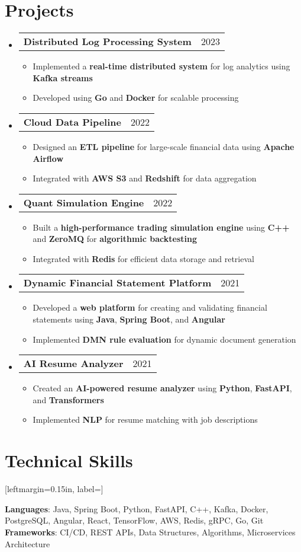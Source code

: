 \documentclass[letterpaper,11pt]{article}
\makeatletter
\newcommand{\resumeItem}[1]{
    \item\small{
            {#1 \vspace{-2pt}}
    }
}
\newcommand{\resumeProjectHeading}[2]{
    \item
    \begin{tabular*}{0.97\textwidth}{l@{\extracolsep{\fill}}r}
    \small#1 & #2 \\
    \end{tabular*}\vspace{-7pt}
}
\newcommand{\resumeSubHeadingListStart}{\begin{itemize}[leftmargin=0.15in, label={}]}
\newcommand{\resumeSubHeadingListEnd}{\end{itemize}}
\newcommand{\resumeItemListStart}{\begin{itemize}}
\newcommand{\resumeItemListEnd}{\end{itemize}\vspace{-5pt}}
\makeatother
\begin{document}
\section{Projects}
\resumeSubHeadingListStart
\resumeProjectHeading
{\textbf{Distributed Log Processing System}}{2023}
\resumeItemListStart
\resumeItem{Implemented a \textbf{real-time distributed system} for log analytics using \textbf{Kafka streams}}
\resumeItem{Developed using \textbf{Go} and \textbf{Docker} for scalable processing}
\resumeItemListEnd
\resumeProjectHeading
{\textbf{Cloud Data Pipeline}}{2022}
\resumeItemListStart
\resumeItem{Designed an \textbf{ETL pipeline} for large-scale financial data using \textbf{Apache Airflow}}
\resumeItem{Integrated with \textbf{AWS S3} and \textbf{Redshift} for data aggregation}
\resumeItemListEnd
\resumeProjectHeading
{\textbf{Quant Simulation Engine}}{2022}
\resumeItemListStart
\resumeItem{Built a \textbf{high-performance trading simulation engine} using \textbf{C++} and \textbf{ZeroMQ} for \textbf{algorithmic backtesting}}
\resumeItem{Integrated with \textbf{Redis} for efficient data storage and retrieval}
\resumeItemListEnd
\resumeProjectHeading
{\textbf{Dynamic Financial Statement Platform}}{2021}
\resumeItemListStart
\resumeItem{Developed a \textbf{web platform} for creating and validating financial statements using \textbf{Java}, \textbf{Spring Boot}, and \textbf{Angular}}
\resumeItem{Implemented \textbf{DMN rule evaluation} for dynamic document generation}
\resumeItemListEnd
\resumeProjectHeading
{\textbf{AI Resume Analyzer}}{2021}
\resumeItemListStart
\resumeItem{Created an \textbf{AI-powered resume analyzer} using \textbf{Python}, \textbf{FastAPI}, and \textbf{Transformers}}
\resumeItem{Implemented \textbf{NLP} for resume matching with job descriptions}
\resumeItemListEnd
\resumeSubHeadingListEnd

\section{Technical Skills}
\begin{itemize}[leftmargin=0.15in, label={]}
\small{\item{
\textbf{Languages}{: Java, Spring Boot, Python, FastAPI, C++, Kafka, Docker, PostgreSQL, Angular, React, TensorFlow, AWS, Redis, gRPC, Go, Git} \\
\textbf{Frameworks}{: CI/CD, REST APIs, Data Structures, Algorithms, Microservices Architecture} \\
}}
\end{itemize}
\end{document}
